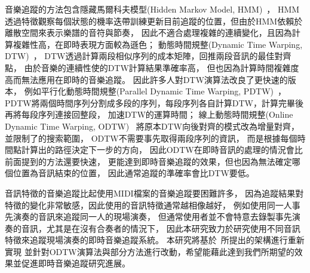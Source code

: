 \documentclass[class=NCU_thesis, crop=false]{standalone}
\begin{document}
音樂追蹤的方法包含隱藏馬爾科夫模型(Hidden Markov Model, HMM)~\cite{cano1999score}，
HMM透過特徵觀察每個狀態的機率迭帶訓練更新目前追蹤的位置，但由於HMM依賴於離散空間來表示樂譜的音符與節奏，
因此不適合處理複雜的連續變化，且因為計算複雜性高，在即時表現方面較為遜色；
動態時間規整(Dynamic Time Warping, DTW)~\cite{Sakoe1978Dynamic, Arzt2012Adaptive}，
DTW透過計算兩段相似序列的成本矩陣，回推兩段音訊的最佳對齊點，
由於音樂的連續性使的DTW計算結果準確率高，
但也因為計算時間複雜度高而無法應用在即時的音樂追蹤。
因此許多人對DTW演算法改良了更快速的版本，
例如平行化動態時間規整(Parallel Dynamic Time Warping, PDTW)~\cite{takahashi2009parallelized, Wei2018Online}，
PDTW將兩個時間序列分割成多段的序列，每段序列各自計算DTW，計算完畢後再將每段序列連接回整段，
加速DTW的運算時間；
線上動態時間規整(Online Dynamic Time Warping, ODTW)~\cite{dixon2005ODTW, Arzt2010Towards, Lin2020AHumanComputerDuetSystem}
將原本DTW向後對齊的模式改為增量對齊，並限制了的搜索範圍，
ODTW不需要事先取得兩段序列的資訊，
而是根據每個時間點計算出的路徑決定下一步的方向，
因此ODTW在即時音訊的處理的情況會比前面提到的方法還要快速，
更能達到即時音樂追蹤的效果，但也因為無法確定哪個位置為音訊結束的位置，
因此通常追蹤的準確率會比DTW要低。

音訊特徵的音樂追蹤比起使用MIDI檔案的音樂追蹤要困難許多，
因為追蹤結果對特徵的變化非常敏感，因此使用的音訊特徵通常越相像越好，
例如使用同一人事先演奏的音訊來追蹤同一人的現場演奏，
但通常使用者並不會特意去錄製事先演奏的音訊，尤其是在沒有合奏者的情況下，
因此本研究致力於研究使用不同音訊特徵來追蹤現場演奏的即時音樂追蹤系統。
本研究將基於~\cite{Lin2020AHumanComputerDuetSystem}所提出的架構進行重新實現
並針對ODTW演算法與部分方法進行改動，希望能藉此達到我們所期望的效果並促進即時音樂追蹤研究進展。

\pagebreak
\end{document}
